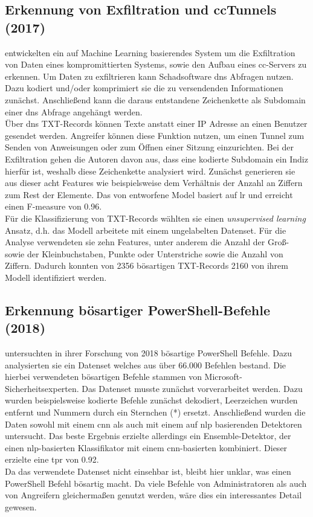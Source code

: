 \documentclass[
    12pt, %
    DIV10,
    ngerman, %
    a4paper, %
    oneside, %
    titlepage, %
    parskip=half, %
    headings=normal, %
    listof=totoc, %
    bibliography=totoc, %
    index=totoc, %
    captions=tableheading, %
    final %
]{scrreprt}
\begin{document}
\subsection{Erkennung von Exfiltration und \acs{cc}Tunnels (2017)}
\textcite{Das2018} entwickelten ein auf Machine Learning basierendes System um die Exfiltration von Daten eines kompromittierten Systems, sowie den Aufbau eines \ac{cc}-Servers zu erkennen. Um Daten zu exfiltrieren kann Schadsoftware \ac{dns} Abfragen nutzen. Dazu kodiert und/oder komprimiert sie die zu versendenden Informationen zunächst. Anschließend kann die daraus entstandene Zeichenkette als Subdomain einer \ac{dns} Abfrage angehängt werden.\\
Über \ac{dns} TXT-Records können Texte anstatt einer IP Adresse an einen Benutzer gesendet werden. Angreifer können diese Funktion nutzen, um einen Tunnel zum Senden von Anweisungen oder zum Öffnen einer Sitzung einzurichten.
Bei der Exfiltration gehen die Autoren davon aus, dass eine kodierte Subdomain ein Indiz hierfür ist, weshalb diese Zeichenkette analysiert wird. Zunächst generieren sie aus dieser acht Features wie beispielsweise dem Verhältnis der Anzahl an Ziffern zum Rest der Elemente. Das von \textcite{Das2018} entworfene Model basiert auf \acl{lr} und erreicht einen F-measure von 0.96.\\
Für die Klassifizierung von TXT-Records wählten sie einen \emph{unsupervised learning} Ansatz, d.h. das Modell arbeitete mit einem ungelabelten Datenset. Für die Analyse verwendeten sie zehn Features, unter anderem die Anzahl der Groß- sowie der Kleinbuchstaben, Punkte oder Unterstriche sowie die Anzahl von Ziffern. Dadurch konnten von 2356 bösartigen TXT-Records 2160 von ihrem Modell identifiziert werden.
%
\subsection{Erkennung bösartiger PowerShell-Befehle (2018)}
\textcite{Hendler2018} untersuchten in ihrer Forschung von 2018 bösartige PowerShell Befehle. Dazu analysierten sie ein Datenset welches aus über 66.000 Befehlen bestand. Die hierbei verwendeten bösartigen Befehle stammen von Microsoft-Sicherheitsexperten.  Das Datenset musste zunächst vorverarbeitet werden. Dazu wurden beispielsweise kodierte Befehle zunächst dekodiert, Leerzeichen wurden entfernt und Nummern durch ein Sternchen (*) ersetzt. Anschließend wurden die Daten sowohl mit einem \ac{cnn} als auch mit einem auf \ac{nlp} basierenden Detektoren untersucht. Das beste Ergebnis erzielte allerdings ein Ensemble-Detektor, der einen \ac{nlp}-basierten Klassifikator mit einem \ac{cnn}-basierten kombiniert. Dieser erzielte eine \ac{tpr} von 0.92.\\
Da das verwendete Datenset nicht einsehbar ist, bleibt hier unklar, was einen PowerShell Befehl bösartig macht. Da viele Befehle von Administratoren als auch von Angreifern gleichermaßen genutzt werden, wäre dies ein interessantes Detail gewesen.
%
\end{document}
